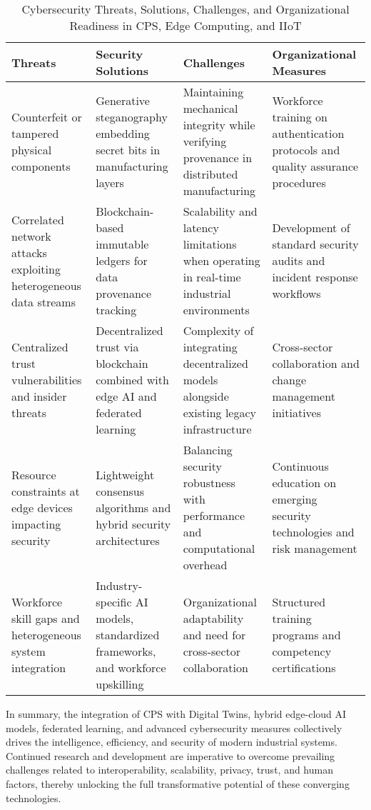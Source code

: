 \documentclass[sigconf]{acmart}
\begin{document}
\begin{table*}[htbp]
\centering
\caption{Cybersecurity Threats, Solutions, Challenges, and Organizational Readiness in CPS, Edge Computing, and IIoT}
\label{tab:cybersecurity_summary}
\begin{adjustbox}{max width=\textwidth}
\begin{tabular}{@{}llll@{}}
\toprule
\textbf{Threats} & \textbf{Security Solutions} & \textbf{Challenges} & \textbf{Organizational Measures} \\ \midrule
Counterfeit or tampered physical components & Generative steganography embedding secret bits in manufacturing layers~\cite{ref9,ref13} & Maintaining mechanical integrity while verifying provenance in distributed manufacturing & Workforce training on authentication protocols and quality assurance procedures \\
Correlated network attacks exploiting heterogeneous data streams & Blockchain-based immutable ledgers for data provenance tracking~\cite{ref20} & Scalability and latency limitations when operating in real-time industrial environments & Development of standard security audits and incident response workflows \\
Centralized trust vulnerabilities and insider threats & Decentralized trust via blockchain combined with edge AI and federated learning~\cite{ref22} & Complexity of integrating decentralized models alongside existing legacy infrastructure & Cross-sector collaboration and change management initiatives \\
Resource constraints at edge devices impacting security & Lightweight consensus algorithms and hybrid security architectures~\cite{ref31} & Balancing security robustness with performance and computational overhead & Continuous education on emerging security technologies and risk management \\
Workforce skill gaps and heterogeneous system integration & Industry-specific AI models, standardized frameworks, and workforce upskilling~\cite{ref32} & Organizational adaptability and need for cross-sector collaboration & Structured training programs and competency certifications \\ \bottomrule
\end{tabular}
\end{adjustbox}
\end{table*}

\bigskip

\noindent In summary, the integration of CPS with Digital Twins, hybrid edge-cloud AI models, federated learning, and advanced cybersecurity measures collectively drives the intelligence, efficiency, and security of modern industrial systems. Continued research and development are imperative to overcome prevailing challenges related to interoperability, scalability, privacy, trust, and human factors, thereby unlocking the full transformative potential of these converging technologies.
\end{document}
